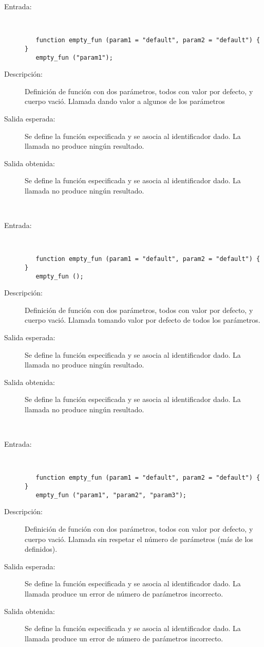 	\begin{description}
		\item [Entrada:] \hfill \\
\begin{lstlisting}
   function empty_fun (param1 = "default", param2 = "default") { } 
   empty_fun ("param1");
\end{lstlisting}
		\item [Descripción:] Definición de función con dos parámetros, todos con valor por defecto, y cuerpo vació. Llamada dando valor a algunos de los parámetros
		\item [Salida esperada:] Se define la función especificada y se asocia al identificador dado. La llamada no produce ningún resultado.
		\item [Salida obtenida:] Se define la función especificada y se asocia al identificador dado. La llamada no produce ningún resultado.
	\end{description}
\hfil \\
	\begin{description}
		\item [Entrada:] \hfill \\
\begin{lstlisting}
   function empty_fun (param1 = "default", param2 = "default") { } 
   empty_fun ();
\end{lstlisting}
		\item [Descripción:] Definición de función con dos parámetros, todos con valor por defecto, y cuerpo vació. Llamada tomando valor por defecto de todos los parámetros.
		\item [Salida esperada:] Se define la función especificada y se asocia al identificador dado. La llamada no produce ningún resultado. 
		\item [Salida obtenida:] Se define la función especificada y se asocia al identificador dado. La llamada no produce ningún resultado.
	\end{description}
\hfil \\
	\begin{description}
		\item [Entrada:] \hfill \\
\begin{lstlisting}
   function empty_fun (param1 = "default", param2 = "default") { } 
   empty_fun ("param1", "param2", "param3");
\end{lstlisting}
		\item [Descripción:] Definición de función con dos parámetros, todos con valor por defecto, y cuerpo vació. Llamada sin respetar el número de parámetros (más de los definidos).
		\item [Salida esperada:] Se define la función especificada y se asocia al identificador dado. La llamada produce un error de número de parámetros incorrecto.
		\item [Salida obtenida:] Se define la función especificada y se asocia al identificador dado. La llamada produce un error de número de parámetros incorrecto.
	\end{description}
